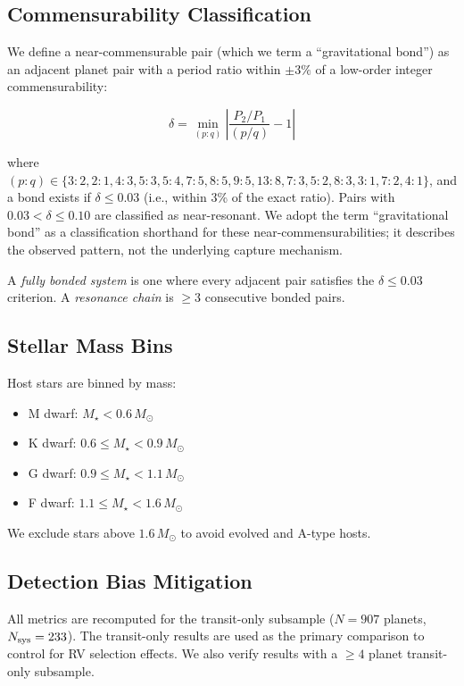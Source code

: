 \documentclass[twocolumn,usenatbib]{mnras}
\begin{document}
\subsection{Commensurability Classification}

We define a near-commensurable pair (which we term a
``gravitational bond'') as an adjacent planet pair with a period ratio within
$\pm 3\%$ of a low-order integer commensurability:

\begin{equation}
\delta = \min_{(p:q)} \left| \frac{P_2/P_1}{(p/q)} - 1 \right|
\label{eq:delta}
\end{equation}

where $(p:q) \in \{3:2, 2:1, 4:3, 5:3, 5:4, 7:5, 8:5, 9:5, 13:8, 7:3, 5:2, 8:3,
3:1, 7:2, 4:1\}$, and a bond exists if $\delta \leq 0.03$ (i.e., within 3\%
of the exact ratio). Pairs with $0.03 < \delta \leq 0.10$ are classified as
near-resonant. We adopt the term ``gravitational bond'' as a classification
shorthand for these near-commensurabilities; it describes the observed pattern,
not the underlying capture mechanism.

A \textit{fully bonded system} is one where every adjacent pair satisfies the
$\delta \leq 0.03$ criterion. A \textit{resonance chain} is $\geq 3$
consecutive bonded pairs.

\subsection{Stellar Mass Bins}

Host stars are binned by mass:
\begin{itemize}
  \item M dwarf: $M_\star < 0.6\,M_\odot$
  \item K dwarf: $0.6 \leq M_\star < 0.9\,M_\odot$
  \item G dwarf: $0.9 \leq M_\star < 1.1\,M_\odot$
  \item F dwarf: $1.1 \leq M_\star < 1.6\,M_\odot$
\end{itemize}
We exclude stars above $1.6\,M_\odot$ to avoid evolved and A-type hosts.

\subsection{Detection Bias Mitigation}

All metrics are recomputed for the transit-only subsample ($N = 907$ planets,
$N_{\rm sys} = 233$). The transit-only results are used as the primary
comparison to control for RV selection effects. We also verify results with a
$\geq 4$ planet transit-only subsample.
\end{document}
